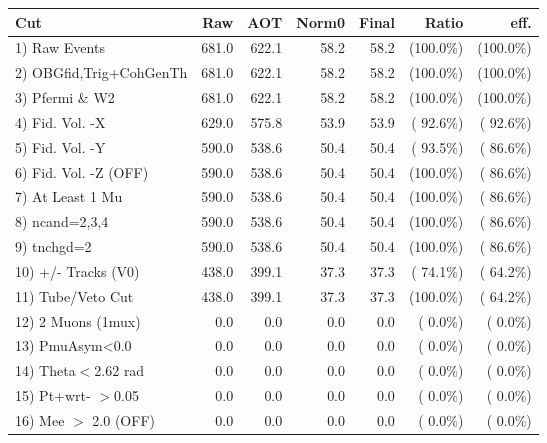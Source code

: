  \begin{table}[h!]\centering
 \begin{tabular}{||l||r|r|r|r|r|r||}
 \hline
 \hline
 Cut & Raw & AOT & Norm0 & Final & Ratio & eff.       \\
 \hline
  1) Raw Events           &        681.0 &        622.1 &         58.2 &         58.2 & (100.0\%) & (100.0\%) \\
  2) OBGfid,Trig+CohGenTh &        681.0 &        622.1 &         58.2 &         58.2 & (100.0\%) & (100.0\%) \\
  3) Pfermi \& W2         &        681.0 &        622.1 &         58.2 &         58.2 & (100.0\%) & (100.0\%) \\
  4) Fid. Vol. -X         &        629.0 &        575.8 &         53.9 &         53.9 & ( 92.6\%) & ( 92.6\%) \\
  5) Fid. Vol. -Y         &        590.0 &        538.6 &         50.4 &         50.4 & ( 93.5\%) & ( 86.6\%) \\
  6) Fid. Vol. -Z (OFF)   &        590.0 &        538.6 &         50.4 &         50.4 & (100.0\%) & ( 86.6\%) \\
  7) At Least 1 Mu        &        590.0 &        538.6 &         50.4 &         50.4 & (100.0\%) & ( 86.6\%) \\
  8) ncand=2,3,4          &        590.0 &        538.6 &         50.4 &         50.4 & (100.0\%) & ( 86.6\%) \\
  9) tnchgd=2             &        590.0 &        538.6 &         50.4 &         50.4 & (100.0\%) & ( 86.6\%) \\
 10) +/- Tracks (V0)      &        438.0 &        399.1 &         37.3 &         37.3 & ( 74.1\%) & ( 64.2\%) \\
 11) Tube/Veto Cut        &        438.0 &        399.1 &         37.3 &         37.3 & (100.0\%) & ( 64.2\%) \\
 12) 2 Muons (1mux)       &          0.0 &          0.0 &          0.0 &          0.0 & (  0.0\%) & (  0.0\%) \\
 13) PmuAsym<0.0          &          0.0 &          0.0 &          0.0 &          0.0 & (  0.0\%) & (  0.0\%) \\
 14) Theta$<$2.62 rad     &          0.0 &          0.0 &          0.0 &          0.0 & (  0.0\%) & (  0.0\%) \\
 15) Pt+wrt- $>$0.05      &          0.0 &          0.0 &          0.0 &          0.0 & (  0.0\%) & (  0.0\%) \\
 16) Mee $>$ 2.0  (OFF)   &          0.0 &          0.0 &          0.0 &          0.0 & (  0.0\%) & (  0.0\%) \\

\end{tabular}
\end{table}
